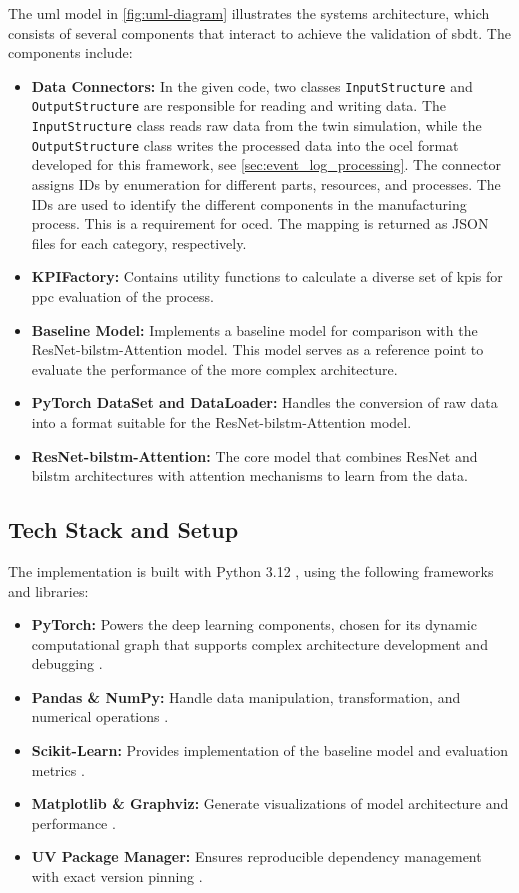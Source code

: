 The \gls{uml} model \autocite{PlantUML} in \autoref{fig:uml-diagram} illustrates the systems architecture, which consists of several components that interact to achieve the validation of \gls{sbdt}. The components include:
\begin{itemize}
  \item \textbf{Data Connectors:} In the given code, two classes \texttt{InputStructure} and \texttt{OutputStructure} are responsible for reading and writing data. The \texttt{InputStructure} class reads raw data from the twin simulation, while the \texttt{OutputStructure} class writes the processed data into the \gls{ocel} format developed for this framework, see \autoref{sec:event_log_processing}. The connector assigns IDs by enumeration for different parts, resources, and processes. The IDs are used to identify the different components in the manufacturing process. This is a requirement for \gls{oced}. The mapping is returned as JSON files for each category, respectively.
  \item \textbf{KPIFactory:} Contains utility functions to calculate a diverse set of \gls{kpi}s for \gls{ppc} evaluation of the process.
  \item \textbf{Baseline Model:} Implements a baseline model for comparison with the ResNet-\gls{bilstm}-Attention model. This model serves as a reference point to evaluate the performance of the more complex architecture.
  \item \textbf{PyTorch DataSet and DataLoader:} Handles the conversion of raw data into a format suitable for the ResNet-\gls{bilstm}-Attention model.
  \item \textbf{ResNet-\gls{bilstm}-Attention:} The core model that combines ResNet and \gls{bilstm} architectures with attention mechanisms to learn from the data.
\end{itemize}

\subsection{Tech Stack and Setup}
The implementation is built with Python 3.12 \autocite{Python}, using the following frameworks and libraries:

\begin{itemize}
  \item \textbf{PyTorch:} Powers the deep learning components, chosen for its dynamic computational graph that supports complex architecture development and debugging \autocite{PyTorch}.
  \item \textbf{Pandas \& NumPy:} Handle data manipulation, transformation, and numerical operations \autocite{NumPy, Pandas}.
  \item \textbf{Scikit-Learn:} Provides implementation of the baseline model and evaluation metrics \autocite{Scikit-Learn}.
  \item \textbf{Matplotlib \& Graphviz:} Generate visualizations of model architecture and performance \autocite{Matplotlib, Graphviz}.
  \item \textbf{UV Package Manager:} Ensures reproducible dependency management with exact version pinning \autocite{UV}.
\end{itemize}

